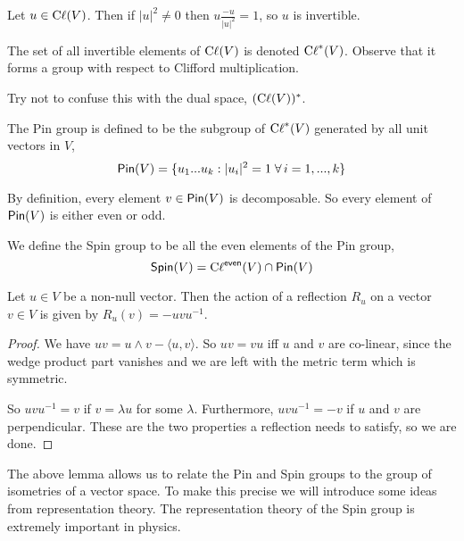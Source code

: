 \begin{remark*}
    Let $u \in \operatorname{C\ell}(V)$. Then if $|u|^2 \neq 0$ then $u\frac{-u}{|u|^2}=1$, so $u$ is invertible.
\end{remark*}
\begin{defn}
    The set of all invertible elements of $\operatorname{C\ell}(V)$ is denoted $\operatorname{C\ell}^*(V)$. Observe that it forms a group with respect to Clifford multiplication. 
\end{defn}
\begin{remark*}
    Try not to confuse this with the dual space, $(\operatorname{C\ell}(V))^*$.
\end{remark*}
\begin{defn}
    The Pin group is defined to be the subgroup of $\operatorname{C\ell}^*(V)$ generated by all unit vectors in $V$,
    \begin{equation}
        \operatorname{\textsf{Pin}}(V) = \{u_1...u_k : |u_i|^2 = 1\; \forall\, i=1,...,k\}
    \end{equation}
\end{defn}
\begin{remark*}
    By definition, every element $v\in \operatorname{\textsf{Pin}}(V)$ is decomposable. So every element of $\operatorname{\textsf{Pin}}(V)$ is either even or odd.
\end{remark*}
\begin{defn} We define the Spin group to be all the even elements of the Pin group,
\begin{equation}
    \operatorname{\textsf{Spin}}(V) = \operatorname{C\ell}^{\textsf{even}}(V)\cap \operatorname{\textsf{Pin}}(V)
\end{equation}
\end{defn}
\begin{lemma}
    Let $u \in V$ be a non-null vector. Then the action of a reflection $R_u$ on a vector $v\in V$ is given by $R_u(v) = -uvu^{-1}$.
\end{lemma}
\begin{proof}
    We have $uv = u\wedge v - \langle u,v\rangle$. So $uv = vu$ iff $u$ and $v$ are co-linear, since the wedge product part vanishes and we are left with the metric term which is symmetric.

    So $uvu^{-1}=v$ if $v = \lambda u$ for some $\lambda$. Furthermore, $uvu^{-1} = -v$ if $u$ and $v$ are perpendicular.  These are the two properties a reflection needs to satisfy, so we are done.
\end{proof}
The above lemma allows us to relate the Pin and Spin groups to the group of isometries of a vector space. To make this precise we will introduce some ideas from representation theory. The representation theory of the Spin group is extremely important in physics.

